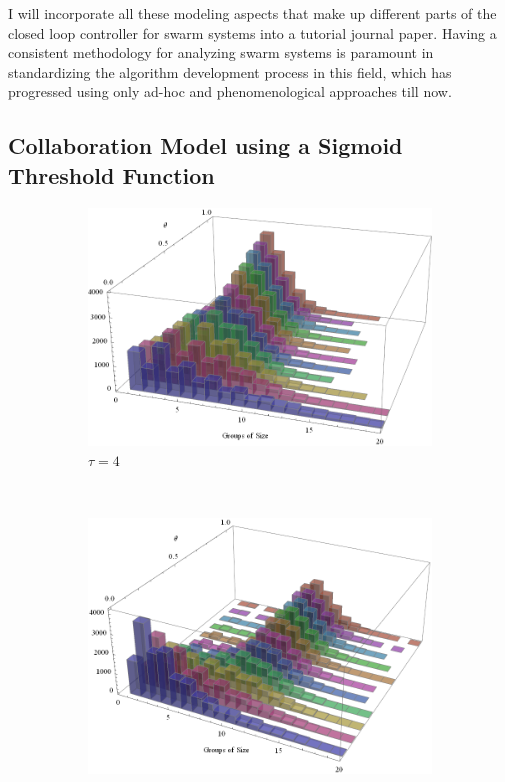 \documentclass[11pt, onecolumn, compsoc, letterpaper]{article}
\begin{document}
I will incorporate all these modeling aspects that make up different parts of the closed loop controller for swarm systems into a tutorial journal paper. Having a consistent methodology for analyzing swarm systems is paramount in standardizing the algorithm development process in this field, which has progressed using only ad-hoc and phenomenological approaches till now.

\subsection{Collaboration Model using a Sigmoid Threshold Function}
\begin{figure}[!htb]
\begin{subfigure}{0.5\textwidth}
\centering\includegraphics[width=1.0\textwidth]{../assets/collabratesweep4.png}
\centering\caption{$\tau = 4$}\label{fig:collabsweep4}
\end{subfigure}~
\begin{subfigure}{0.5\textwidth}
\centering\includegraphics[width=1.0\textwidth]{../assets/collabratesweep8.png}

\end{subfigure}
\end{figure}
\end{document}
